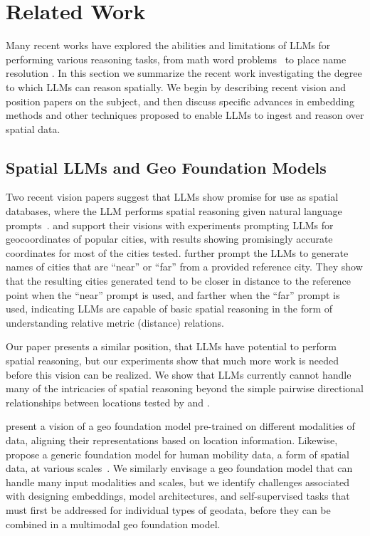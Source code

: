 \section{Related Work}
\label{section:related}
\normalsize

Many recent works have explored the abilities and limitations of LLMs for performing various reasoning tasks, from math word problems~\cite{Gao2023, Badaro2023} to place name resolution \cite{Mai2023}.
In this section we summarize the recent work investigating the degree to which LLMs can reason spatially.
We begin by describing recent vision and position papers on the subject, and then discuss specific advances in embedding methods and other techniques proposed to enable LLMs to ingest and reason over spatial data.


\subsection{Spatial LLMs and Geo Foundation Models}
Two recent vision papers suggest that LLMs show promise for use as spatial databases, where the LLM performs spatial reasoning given natural language prompts~\cite{Bhandari2023, Qi2023}.
\citeauthor{Bhandari2023} and \citeauthor{Qi2023} support their visions with experiments prompting LLMs for geocoordinates of popular cities, with results showing promisingly accurate coordinates for most of the cities tested.
\citeauthor{Bhandari2023} further prompt the LLMs to generate names of cities that are ``near'' or ``far'' from a provided reference city.
They show that the resulting cities generated tend to be closer in distance to the reference point when the ``near'' prompt is used, and farther when the ``far'' prompt is used, indicating LLMs are capable of basic spatial reasoning in the form of understanding relative metric (distance) relations.

Our paper presents a similar position, that LLMs have potential to perform spatial reasoning, but our experiments show that much more work is needed before this vision can be realized.
We show that LLMs currently cannot handle many of the intricacies of spatial reasoning beyond the simple pairwise directional relationships between locations tested by \citeauthor{Bhandari2023} and \citeauthor{Qi2023}.

\citeauthor{Mai2023} present a vision of a geo foundation model pre-trained on different modalities of data, aligning their representations based on location information.
Likewise, \citeauthor{Fei2022} propose a generic foundation model for human mobility data, a form of spatial data, at various scales~\cite{Fei2022}.
We similarly envisage a geo foundation model that can handle many input modalities and scales, but we identify challenges associated with designing embeddings, model architectures, and self-supervised tasks that must first be addressed for individual types of geodata, before they can be combined in a multimodal geo foundation model.

